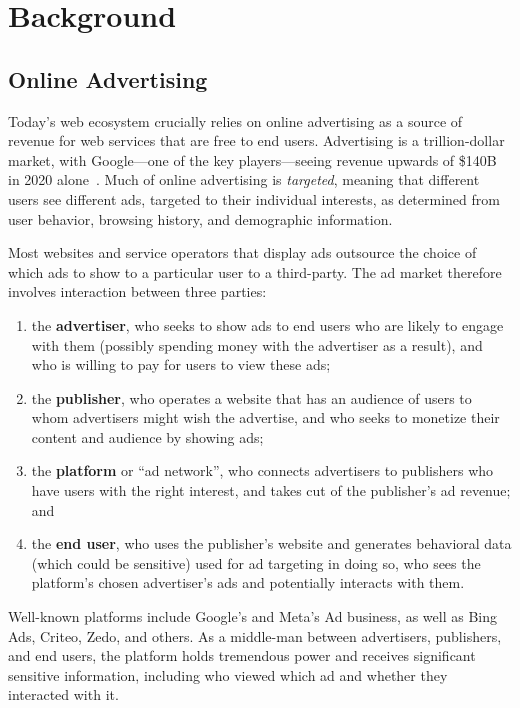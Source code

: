 \section{Background}
\label{s:bg}

\subsection{Online Advertising}

Today's web ecosystem crucially relies on online advertising as a source of
revenue for web services that are free to end users.
%
Advertising is a trillion-dollar market, with Google---one of the key
players---seeing revenue upwards of \$140B in 2020 alone~\cite{xxx}.
%
Much of online advertising is \emph{targeted}, meaning that different users
see different ads, targeted to their individual interests, as determined
from user behavior, browsing history, and demographic information.
%

%
Most websites and service operators that display ads outsource the choice of
which ads to show to a particular user to a third-party.
%
The ad market therefore involves interaction between three parties:
\begin{enumerate}
 \item the \textbf{advertiser}, who seeks to show ads to end users who
   are likely to engage with them (possibly spending money with the
   advertiser as a result), and who is willing to pay for users to view
   these ads;
 \item the \textbf{publisher}, who operates a website that has an audience
   of users to whom advertisers might wish the advertise, and who seeks
   to monetize their content and audience by showing ads;
 \item the \textbf{platform} or ``ad network'', who connects advertisers
   to publishers who have users with the right interest, and takes cut
   of the publisher's ad revenue; and
 \item the \textbf{end user}, who uses the publisher's website and generates
   behavioral data (which could be sensitive) used for ad targeting in doing so,
   who sees the platform's chosen advertiser's ads and potentially interacts
   with them.
\end{enumerate}
%
Well-known platforms include Google's and Meta's Ad business, as well
as Bing Ads, Criteo, Zedo, and others.
%
As a middle-man between advertisers, publishers, and end users, the platform
holds tremendous power and receives significant sensitive information, including
who viewed which ad and whether they interacted with it.
%

